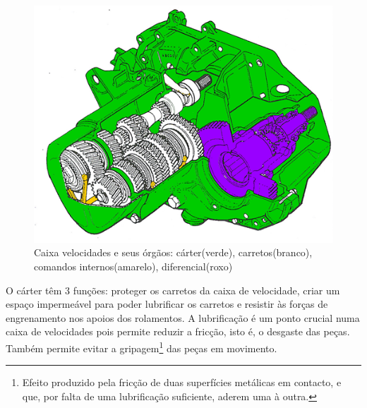\begin{figure}[H]
\centering
\includegraphics[scale=1.0]{figs/caixa}
\caption{Caixa velocidades e seus órgãos: cárter(verde), carretos(branco), comandos internos(amarelo), diferencial(roxo)}\label{caixa_velocidades}
\end{figure}

O cárter têm 3 funções: proteger os carretos da caixa de velocidade, criar um espaço impermeável para poder lubrificar os carretos e resistir às forças de engrenamento nos apoios dos rolamentos. A lubrificação é um ponto crucial numa caixa de velocidades pois permite reduzir a fricção, isto é, o desgaste das peças. Também permite evitar a gripagem\footnote{Efeito produzido pela fricção de duas superfícies metálicas em contacto, e que, por falta de uma lubrificação suficiente, aderem uma à outra.} das peças em movimento.

